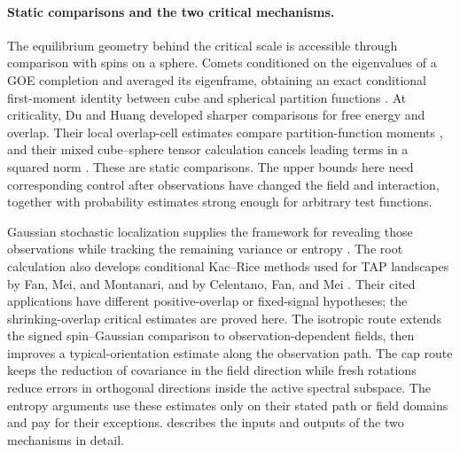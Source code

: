 \paragraph{Static comparisons and the two critical mechanisms.}
The equilibrium geometry behind the critical scale is accessible through
comparison with spins on a sphere. Comets conditioned on the eigenvalues
of a GOE completion and averaged its eigenframe, obtaining an exact
conditional first-moment identity between cube and spherical partition
functions \cite[equations~(2.1)--(2.2)]{Comets1996Spherical}.
At criticality, Du and Huang developed sharper comparisons for free
energy and overlap. Their local overlap-cell estimates compare
partition-function moments
\cite[Theorem~1.6 and Section~3.3]{DuHuang2026CriticalFluctuations},
and their mixed cube--sphere tensor calculation cancels leading terms
in a squared norm
\cite[Section~3.2, Lemma~3.5]{DuHuang2026CriticalOverlap}.
These are static comparisons. The upper bounds here need corresponding
control after observations have changed the field and interaction,
together with probability estimates strong enough for arbitrary test
functions.

Gaussian stochastic localization supplies the framework for revealing
those observations while tracking the remaining variance or entropy
\cite{Eldan2013StochasticLocalization,ChenEldan2025Localization}.
The root calculation also develops conditional Kac--Rice methods used
for TAP landscapes by Fan, Mei, and Montanari, and by Celentano, Fan, and
Mei \cite{FanMeiMontanari2021,CelentanoFanMei2023}. Their cited
applications have different positive-overlap or fixed-signal hypotheses;
the shrinking-overlap critical estimates are proved here.
The isotropic route extends the signed spin--Gaussian comparison to
observation-dependent fields, then improves a typical-orientation estimate
along the observation path. The cap route keeps the reduction of covariance
in the field direction while fresh rotations reduce errors in orthogonal
directions inside the active spectral subspace. The entropy arguments
use these estimates only on their stated path or field domains and pay
for their exceptions.  describes the inputs
and outputs of the two mechanisms in detail.
